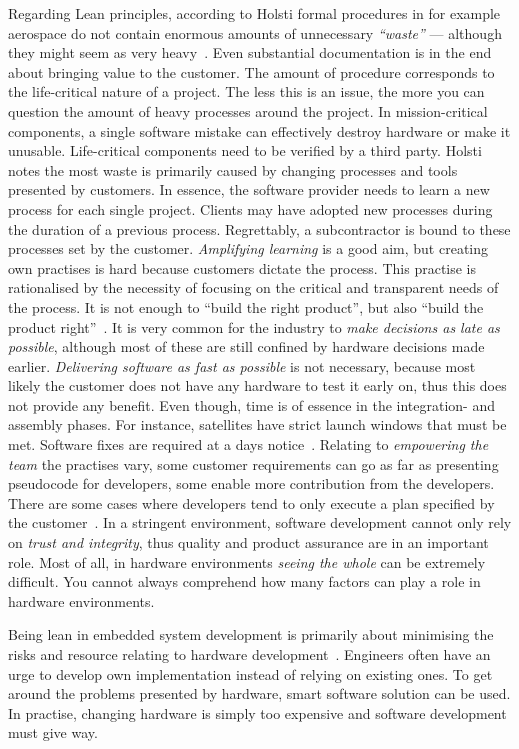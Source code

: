 \documentclass[english]{tktltiki2}
\begin{document}
Regarding Lean principles, according to Holsti formal procedures in for example aerospace do not contain enormous amounts of unnecessary \emph{“waste”} — although they might seem as very heavy~\cite{Hol15b}. Even substantial documentation is in the end about bringing value to the customer. The amount of procedure corresponds to the life-critical nature of a project. The less this is an issue, the more you can question the amount of heavy processes around the project. In mission-critical components, a single software mistake can effectively destroy hardware or make it unusable. Life-critical components need to be verified by a third party. Holsti notes the most waste is primarily caused by changing processes and tools presented by customers. In essence, the software provider needs to learn a new process for each single project. Clients may have adopted new processes during the duration of a previous process. Regrettably, a subcontractor is bound to these processes set by the customer. \emph{Amplifying learning} is a good aim, but creating own practises is hard because customers dictate the process. This practise is rationalised by the necessity of focusing on the critical and transparent needs of the process. It is not enough to “build the right product”, but also “build the product right”~\cite{Hol15b}. It is very common for the industry to \emph{make decisions as late as possible}, although most of these are still confined by hardware decisions made earlier. \emph{Delivering software as fast as possible} is not necessary, because most likely the customer does not have any hardware to test it early on, thus this does not provide any benefit. Even though, time is of essence in the integration- and assembly phases. For instance, satellites have strict launch windows that must be met. Software fixes are required at a days notice~\cite{Hol15b}. Relating to \emph{empowering the team} the practises vary, some customer requirements can go as far as presenting pseudocode for developers, some enable more contribution from the developers. There are some cases where developers tend to only execute a plan specified by the customer~\cite{Hol15b}. In a stringent environment, software development cannot only rely on \emph{trust and integrity}, thus quality and product assurance are in an important role. Most of all, in hardware environments \emph{seeing the whole} can be extremely difficult. You cannot always comprehend how many factors can play a role in hardware environments.

Being lean in embedded system development is primarily about minimising the risks and resource relating to hardware development~\cite{Hol15a}. Engineers often have an urge to develop own implementation instead of relying on existing ones. To get around the problems presented by hardware, smart software solution can be used. In practise, changing hardware is simply too expensive and software development must give way.
\end{document}
